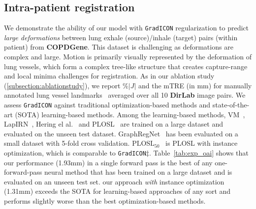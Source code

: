 \vspace{-0.15cm}
\subsection{Intra-patient registration}
\label{sec:exp_lung}
\vspace{-0.15cm}
We demonstrate the ability of our model with \texttt{GradICON} regularization to predict \emph{large deformations} between lung exhale (source)/inhale (target) pairs (within patient) from \textbf{COPDGene}. %
This dataset is challenging as deformations are complex and large. Motion is primarily visually represented by the deformation of lung vessels, which form a complex tree-like structure that creates capture-range and local minima challenges for registration. As in our ablation study
(\ref{subsection:ablationstudy}), we report $\%|J|$ and the mTRE (in mm) for manually annotated lung vessel landmarks~\cite{castillo2013reference} averaged over all 10 \textbf{DirLab} image pairs. %
We assess \texttt{GradICON} against traditional optimization-based methods and state-of-the-art (SOTA) learning-based methods. Among the learning-based methods, VM~\cite{balakrishnan2019voxelmorph}, LapIRN~\cite{mok2020large}, Hering el al.~\cite{hering2021cnn} and PLOSL~\cite{wang2022PLOSL} are trained on a large dataset and evaluated on the unseen test dataset. GraphRegNet~\cite{hansen2021graphregnet} has been evaluated on a small dataset with 5-fold cross validation. $\text{PLOSL}_{50}$~\cite{wang2022PLOSL} is PLOSL with instance optimization, which is comparable to \texttt{GradICON}$\ddagger$. Table~\ref{tab:exp_oai} shows that our performance (1.93mm) in a single forward pass is the best of any one-forward-pass neural method that has been trained on a large dataset and is evaluated on an unseen test set. our approach \emph{with} instance optimization (1.31mm) exceeds the SOTA for learning-based approaches of any sort and performs slightly worse than the best optimization-based methods. %

